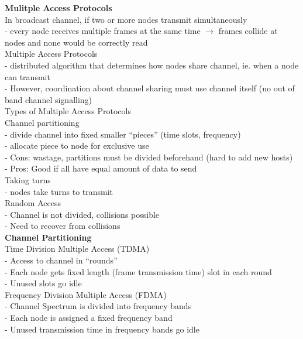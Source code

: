 \documentclass[10pt, a4paper]{article}
\newcommand{\blue}[1]{{\color{MidnightBlue}#1}}
\newcommand{\red}[1]{{\color{red}#1}}
\newcommand{\green}[1]{{\color{ForestGreen}#1}}
\begin{document}
\begin{multicols*}{3}
		\textbf{Mulitple Access Protocols}\\
		In broadcast channel, if two or more nodes transmit simultaneously\\
		- every node receives multiple frames at the same time $\rightarrow$ frames \blue{collide} at nodes and none would be correctly read\\

		\red{Multiple Access Protocols}\\
		- distributed algorithm that determines how nodes share channel, ie. when a node can transmit\\
		- However, coordination about channel sharing must use channel itself (no out of band channel signalling)\\

		Types of Multiple Access Protocols\\
		\red{Channel partitioning}\\
		- divide channel into fixed smaller ``pieces'' (time slots, frequency)\\
		- allocate piece to node for exclusive use\\
		- \red{Cons:} wastage, partitions must be divided beforehand (hard to add new hosts)\\
		- \green{Pros:} Good if all have equal amount of data to send\\
		\red{Taking turns}\\
		- nodes take turns to transmit\\
		\red{Random Access}\\
		- Channel is not divided, collisions possible\\
		- Need to recover from collisions\\

		\textbf{Channel Partitioning}\\
		Time Division Multiple Access (TDMA)\\
		- Access to channel in ``rounds''\\
		- Each node gets fixed length (frame transmission time) slot in each round\\
		- \blue{Unused slots go idle}\\

		Frequency Division Multiple Access (FDMA)\\
		- Channel Spectrum is divided into frequency bands\\
		- Each node is assigned a fixed frequency band\\
		- Unused transmission time in frequency bands go idle\\


\end{multicols*}
\end{document}
